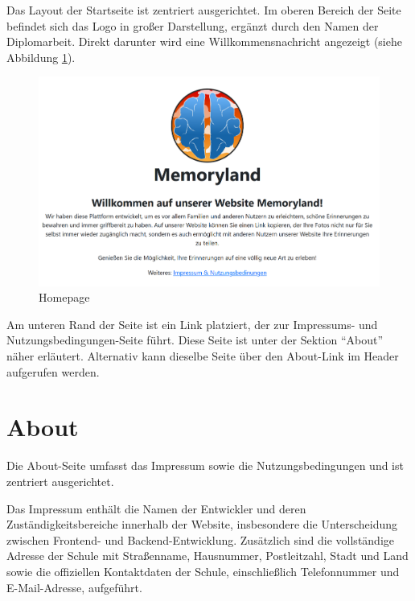 Das Layout der Startseite ist zentriert ausgerichtet. Im oberen Bereich der Seite befindet 
sich das Logo in gro\ss{}er Darstellung, ergänzt durch den Namen der Diplomarbeit. Direkt 
darunter wird eine Willkommensnachricht angezeigt (siehe Abbildung \ref{fig:homepage}).

\begin{figure} [h t]
    \centering
    \includegraphics[scale=0.4]{pics/home_page.PNG}
    \caption{Homepage}
    \label{fig:homepage}
\end{figure}

Am unteren Rand der Seite ist ein Link platziert, der zur Impressums- und 
Nutzungsbedingungen-Seite führt. Diese Seite ist unter der Sektion ``About'' 
näher erläutert. Alternativ kann dieselbe Seite über den About-Link im Header 
aufgerufen werden.

\section{About}

Die About-Seite umfasst das Impressum sowie die Nutzungsbedingungen und ist zentriert 
ausgerichtet.


Das Impressum enthält die Namen der Entwickler und deren Zuständigkeitsbereiche 
innerhalb der Website, insbesondere die Unterscheidung zwischen Frontend- und 
Backend-Entwicklung. Zusätzlich sind die vollständige Adresse der Schule mit 
Stra\ss{}enname, Hausnummer, Postleitzahl, Stadt und Land sowie die offiziellen 
Kontaktdaten der Schule, einschlie\ss{}lich Telefonnummer und E-Mail-Adresse, 
aufgeführt.

